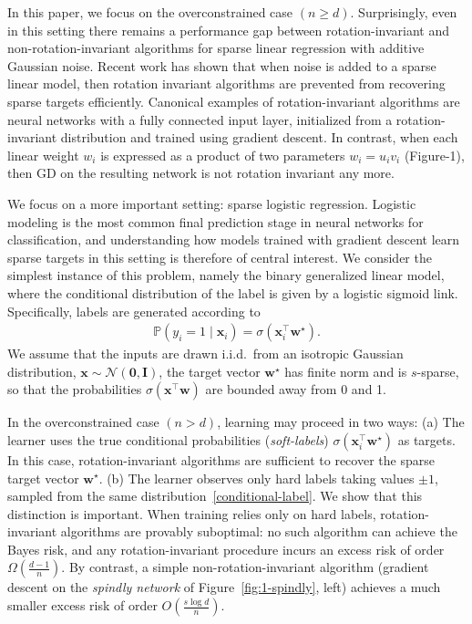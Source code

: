 \documentclass{article}
\theoremstyle{plain}
\theoremstyle{definition}
\theoremstyle{remark}
\begin{document}
In this paper, we focus on the overconstrained case $(n \geq d)$. Surprisingly, even in this setting there remains a performance gap between rotation-invariant and non-rotation-invariant algorithms for sparse linear regression with additive Gaussian noise. Recent work \cite{pmlr-v272-warmuth25a} has shown that when noise is added to a sparse linear model, then rotation invariant algorithms are prevented from recovering sparse targets efficiently. Canonical examples of rotation-invariant 
algorithms are neural networks with a fully connected input
layer, initialized from a rotation-invariant distribution
and trained using gradient descent. In contrast, when each
linear weight $w_i$ is expressed as a product of two
parameters $w_{i}=u_{i}v_{i}$ (Figure-1), then GD on the resulting
network is not rotation invariant any more. 

We focus on a more important setting: sparse logistic regression. Logistic modeling is the most common final prediction stage in neural networks for classification, and understanding how models trained with gradient descent learn sparse targets in this setting is therefore of central interest. We consider the simplest instance of this problem, namely the binary generalized linear model, where the conditional distribution of the label is given by a logistic sigmoid link. Specifically, labels are generated according to
\begin{align}
\label{conditional-label}
\mathbb{P}(y_i = 1 \mid \mathbf{x}_i)
= \sigma\!\left(\mathbf{x}_i^\top \mathbf{w}^\star\right).
\end{align}
We assume that the inputs are drawn i.i.d.\ from an isotropic Gaussian distribution,
$\mathbf{x} \sim \mathcal{N}(\mathbf{0}, \mathbf{I})$, the target vector
$\mathbf{w}^\star$ has finite norm and is $s$-sparse, so that the probabilities  $\sigma(\mathbf{x}^\top\mathbf{w})$ are bounded away from 0 and 1.

In the overconstrained case $(n > d)$, learning may proceed in two ways: (a) The learner uses the true conditional probabilities (\textit{soft-labels})
$\sigma(\mathbf{x}_i^\top \mathbf{w}^\star)$ as targets. In this case, rotation-invariant algorithms are sufficient to recover the sparse target vector $\mathbf{w}^\star$. (b) The learner observes only hard labels taking values $\pm 1$, sampled from the same distribution~\eqref{conditional-label}. We show that this distinction is important. When training relies only on hard labels, rotation-invariant algorithms are provably suboptimal: no such algorithm can achieve the Bayes risk, and any
rotation-invariant procedure incurs an excess risk of order
$\Omega\!\left(\frac{d-1}{n}\right)$. By contrast, 
a simple non-rotation-invariant algorithm 
(gradient descent on the \textit{spindly network} of Figure~\ref{fig:1-spindly}, left) achieves a much smaller excess risk of order $O\!\left(\frac{s \log d}{n}\right)$.
\end{document}
